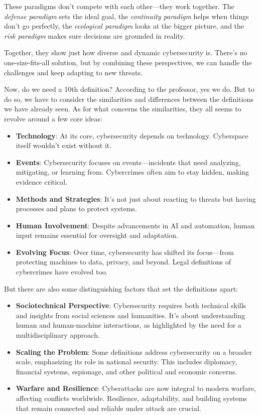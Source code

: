 These paradigms don’t compete with each other—they work together. The
\emph{defense paradigm} sets the ideal goal, the \emph{continuity
paradigm} helps when things don’t go perfectly, the \emph{ecological
paradigm} looks at the bigger picture, and the \emph{risk paradigm}
makes sure decisions are grounded in reality.

Together, they show just how diverse and dynamic cybersecurity is.
There’s no one-size-fits-all solution, but by combining these
perspectives, we can handle the challenges and keep adapting to new
threats.

Now, do we need a 10th definition? According to the professor, yes we
do. But to do so, we have to consider the similarities and differences 
between the definitions we have already seen. 
As for what concerns the similarities, they all seems to revolve
around a few core ideas:
\begin{itemize}
    \item \textbf{Technology}: At its core, cybersecurity depends on
      technology. Cyberspace itself wouldn’t exist without it.
    \item \textbf{Events}: Cybersecurity focuses on events—incidents
      that need analyzing, mitigating, or learning from. Cybercrimes
      often aim to stay hidden, making evidence critical.
    \item \textbf{Methods and Strategies}: It’s not just about
      reacting to threats but having processes and plans to protect
      systems.
    \item \textbf{Human Involvement}: Despite advancements in AI and
      automation, human input remains essential for oversight and
      adaptation.
    \item \textbf{Evolving Focus}: Over time, cybersecurity has
      shifted its focus—from protecting machines to data, privacy, and
      beyond. Legal definitions of cybercrimes have evolved too.
\end{itemize}


But there are also some distinguishing factors that set the 
definitions apart:
\begin{itemize}
    \item \textbf{Sociotechnical Perspective}: Cybersecurity requires
      both technical skills and insights from social sciences and
      humanities. It’s about understanding human and human-machine
      interactions, as highlighted by the need for a multidisciplinary
      approach.
    \item \textbf{Scaling the Problem}: Some definitions address
      cybersecurity on a broader scale, emphasizing its role in
      national security. This includes diplomacy, financial systems,
      espionage, and other political and economic concerns.
    \item \textbf{Warfare and Resilience}: Cyberattacks are now
      integral to modern warfare, affecting conflicts worldwide.
      Resilience, adaptability, and building systems that remain
      connected and reliable under attack are crucial.
\end{itemize}

